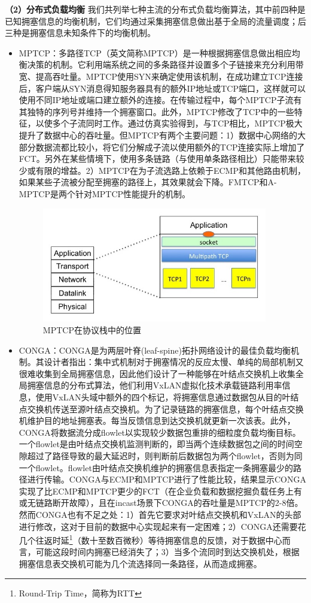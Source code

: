 \textbf{（2）分布式负载均衡}
\label{sec:loadBalance}
我们共列举七种主流的分布式负载均衡算法，其中前四种是已知拥塞信息的均衡机制，它们均通过采集拥塞信息做出基于全局的流量调度；后三种是拥塞信息未知条件下的均衡机制。
\begin{itemize}
    \item MPTCP\cite{raiciu2011MPTCP}：多路径TCP（英文简称MPTCP）是一种根据拥塞信息做出相应均衡决策的机制。它利用端系统之间的多条路径并设置多个子链接来充分利用带宽、提高吞吐量。MPTCP使用SYN来确定使用该机制，在成功建立TCP连接后，客户端从SYN消息得知服务器具有的额外IP地址或TCP端口，这样就可以使用不同IP地址或端口建立额外的连接。在传输过程中，每个MPTCP子流有其独特的序列号并维持一个拥塞窗口。此外，MPTCP修改了TCP中的一些特征，以使多个子流同时工作。\cite{raiciu2011MPTCP}通过仿真实验得到，与TCP相比，MPTCP极大提升了数据中心的吞吐量。但MPTCP有两个主要问题：1）数据中心网络的大部分数据流都比较小，将它们分解成子流以使用额外的TCP连接实际上增加了FCT。另外在某些情境下，使用多条链路（与使用单条路径相比）只能带来较少或有限的增益。2）MPTCP在为子流选路上依赖于ECMP和其他路由机制，如果某些子流被分配至拥塞的路径上，其效果就会下降。FMTCP\cite{cui2015fmtcp}和A-MPTCP\cite{Coudron2013AMPTCP}是两个针对MPTCP性能提升的机制。
\begin{figure}[ht]
\centering
\includegraphics[height=5cm]{figure/Multipath_TCP_architecture.jpg}
\caption{MPTCP在协议栈中的位置}
\label{fig:MPTCP}
\end{figure}
    \item CONGA\cite{alizadeh2014CONGA}：CONGA是为两层叶脊(leaf-spine)拓扑网络设计的最佳负载均衡机制。其设计者指出：集中式机制对于拥塞情况的反应太慢、单纯的局部机制又很难收集到全局拥塞信息，因此他们设计了一种能够在叶结点交换机上收集全局拥塞信息的分布式算法，他们利用VxLAN\cite{maha2014VxLAN}虚拟化技术承载链路利用率信息，使用VxLAN头域中额外的四个标记，将拥塞信息通过数据包从目的叶结点交换机传送至源叶结点交换机。为了记录链路的拥塞信息，每个叶结点交换机维护目的地址拥塞表。每当反馈信息到达交换机就更新一次该表。此外，CONGA将数据流分成flowlet以实现较少数据包重排的细粒度负载均衡目标。一个flowlet是由叶结点交换机监测判断的，即当两个连续数据包之间的时间空隙超过了路径导致的最大延迟时，则判断前后数据包为两个flowlet，否则为同一个flowlet。flowlet由叶结点交换机维护的拥塞信息表指定一条拥塞最少的路径进行传输。CONGA与ECMP和MPTCP进行了性能比较，结果显示CONGA实现了比ECMP和MPTCP更少的FCT（在企业负载和数据挖掘负载任务上有或无链路断开故障），且在incast场景下CONGA的吞吐量是MPTCP的2-8倍。然而CONGA也有不足之处：1）首先它要求对叶结点交换机和VxLAN的头部进行修改，这对于目前的数据中心实现起来有一定困难；2）CONGA还需要花几个往返时延\footnote{Round-Trip Time，简称为RTT}（数十至数百微秒）等待拥塞信息的反馈，对于数据中心而言，可能这段时间内拥塞已经消失了；3）当多个流同时到达交换机处，根据拥塞信息表交换机可能为几个流选择同一条路径，从而造成拥塞。

\end{itemize}
